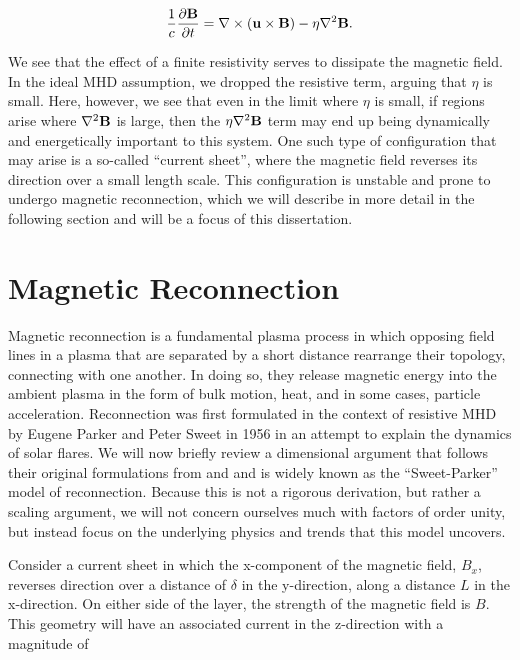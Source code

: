 \begin{equation}
		\frac{1}{c}\frac{\partial \bold{B}}{\partial t} =\nabla \times (\bold{u}\times\bold{B}) -\eta \nabla^2 \bold{B}.
\end{equation}

We see that the effect of a finite resistivity serves to dissipate the magnetic field.  In the ideal MHD assumption, we dropped the resistive term, arguing that $\eta$ is small.  Here, however, we see that even in the limit where $\eta$ is small, if regions arise where $\nabla^2 \bold{B}$ is large, then the $\eta \nabla^2 \bold{B}$ term may end up being dynamically and energetically important to this system.  One such type of configuration that may arise is a so-called ``current sheet'', where the magnetic field reverses its direction over a small length scale.  This configuration is unstable and prone to undergo magnetic reconnection, which we will describe in more detail in the following section and will be a focus of this dissertation.

\section{Magnetic Reconnection}
Magnetic reconnection is a fundamental plasma process in which opposing field lines in a plasma that are separated by a short distance rearrange their topology, connecting with one another.  In doing so, they release magnetic energy into the ambient plasma in the form of bulk motion, heat, and in some cases, particle acceleration.  Reconnection was first formulated in the context of resistive MHD by Eugene Parker and Peter Sweet in 1956 in an attempt to explain the dynamics of solar flares.  We will now briefly review a dimensional argument that follows their original formulations from \citet{parker1957} and \cite{sweet1958} and is widely known as the ``Sweet-Parker'' model of reconnection.  Because this is not a rigorous derivation, but rather a scaling argument, we will not concern ourselves much with factors of order unity, but instead focus on the underlying physics and trends that this model uncovers.

Consider a current sheet in which the x-component of the magnetic field, $B_x$, reverses direction over a distance of $\delta$ in the y-direction, along a distance $L$ in the x-direction.  On either side of the layer, the strength of the magnetic field is $B$.  This geometry will have an associated current in the z-direction with a magnitude of 

